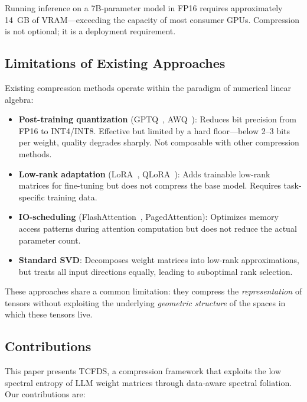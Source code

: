 \documentclass[11pt,a4paper]{article}
\begin{document}
Running inference on a 7B-parameter model in FP16 requires approximately 14~GB of VRAM---exceeding the capacity of most consumer GPUs. Compression is not optional; it is a deployment requirement.

\subsection{Limitations of Existing Approaches}

Existing compression methods operate within the paradigm of numerical linear algebra:

\begin{itemize}
    \item \textbf{Post-training quantization} (GPTQ~\cite{frantar2023gptq}, AWQ~\cite{lin2024awq}): Reduces bit precision from FP16 to INT4/INT8. Effective but limited by a hard floor---below 2--3 bits per weight, quality degrades sharply. Not composable with other compression methods.
    \item \textbf{Low-rank adaptation} (LoRA~\cite{hu2022lora}, QLoRA~\cite{dettmers2023qlora}): Adds trainable low-rank matrices for fine-tuning but does not compress the base model. Requires task-specific training data.
    \item \textbf{IO-scheduling} (FlashAttention~\cite{dao2022flashattention}, PagedAttention): Optimizes memory access patterns during attention computation but does not reduce the actual parameter count.
    \item \textbf{Standard SVD}: Decomposes weight matrices into low-rank approximations, but treats all input directions equally, leading to suboptimal rank selection.
\end{itemize}

These approaches share a common limitation: they compress the \emph{representation} of tensors without exploiting the underlying \emph{geometric structure} of the spaces in which these tensors live.

\subsection{Contributions}

This paper presents TCFDS, a compression framework that exploits the low spectral entropy of LLM weight matrices through data-aware spectral foliation. Our contributions are:
\end{document}
